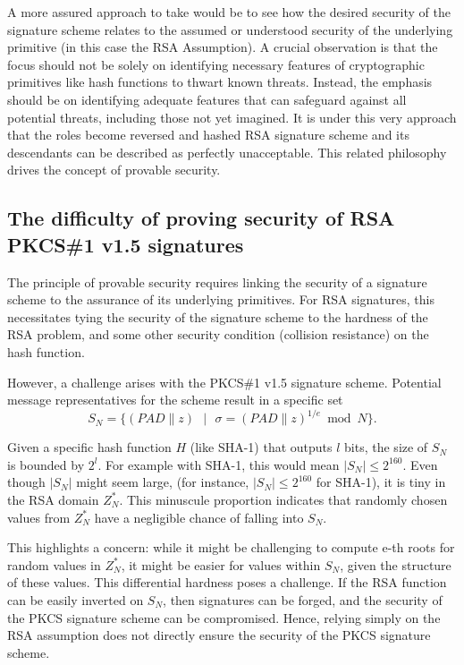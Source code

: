 \documentclass[]{final_report}
\theoremstyle{definition}
\begin{document}
A more assured approach to take would be to see how the desired security of the signature scheme relates to the assumed or understood security of the underlying primitive (in this case the RSA Assumption). A crucial observation is that the focus should not be solely on identifying necessary features of cryptographic primitives like hash functions to thwart known threats. Instead, the emphasis should be on identifying adequate features that can safeguard against all potential threats, including those not yet imagined. It is under this very approach that the roles become reversed and hashed RSA signature scheme and its descendants can be described as perfectly unacceptable. This related philosophy drives the concept of provable security.

\subsection{The difficulty of proving security of RSA PKCS\#1 v1.5 signatures}

The principle of provable security requires linking the security of a signature scheme to the assurance of its underlying primitives. For RSA signatures, this necessitates tying the security of the signature scheme to the hardness of the RSA problem, and some other security condition (collision resistance) on the hash function.

However, a challenge arises with the PKCS\#1 v1.5 signature scheme. Potential message representatives for the scheme result in a specific set
\[ S_N = \{ (PAD \| z) \text{ } | \text{ } \sigma = (PAD \| z)^{1/e} \bmod N \}. \] 

Given a specific hash function $H$ (like SHA-1) that outputs $l$ bits, the size of $S_N$ is bounded by $2^l$. For example with SHA-1, this would mean  $|S_N| \leq 2^{160}.$ Even though $|S_N|$ might seem large, (for instance, \( |S_N| \leq 2^{160} \) for SHA-1), it is tiny in the RSA domain \( Z_N^* \). This minuscule proportion indicates that randomly chosen values from \( Z_N^* \) have a negligible chance of falling into \( S_N \).

This highlights a concern: while it might be challenging to compute e-th roots for random values in $Z_N^*$, it might be easier for values within $S_N$, given the structure of these values. This differential hardness poses a challenge. If the RSA function can be easily inverted on  $S_N$, then signatures can be forged, and the security of the PKCS signature scheme can be compromised. Hence, relying simply on the RSA assumption does not directly ensure the security of the PKCS signature scheme. 
\end{document}
